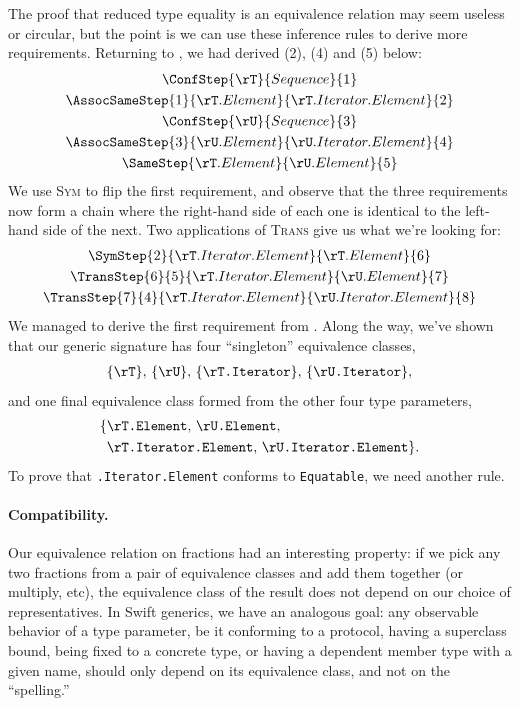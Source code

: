 \documentclass[../generics]{subfiles}
\begin{document}
\begin{example}\label{derived equiv example}
The proof that reduced type equality is an equivalence relation may seem useless or circular, but the point is we can use these inference rules to derive more requirements. Returning to , we had derived (2), (4) and (5) below:
\begin{gather*}
\ConfStep{\rT}{Sequence}{1}\\
\AssocSameStep{1}{\rT.Element}{\rT.Iterator.Element}{2}\\
\ConfStep{\rU}{Sequence}{3}\\
\AssocSameStep{3}{\rU.Element}{\rU.Iterator.Element}{4}\\
\SameStep{\rT.Element}{\rU.Element}{5}
\end{gather*}
We use \textsc{Sym} to flip the first requirement, and observe that the three requirements now form a chain where the right-hand side of each one is identical to the left-hand side of the next. Two applications of \textsc{Trans} give us what we're looking for:
\begin{gather*}
\SymStep{2}{\rT.Iterator.Element}{\rT.Element}{6}\\
\TransStep{6}{5}{\rT.Iterator.Element}{\rU.Element}{7}\\
\TransStep{7}{4}{\rT.Iterator.Element}{\rU.Iterator.Element}{8}
\end{gather*}
We managed to derive the first requirement from . Along the way, we've shown that our generic signature has four ``singleton'' equivalence classes,
\begin{gather*}
\{\texttt{\rT}\},\,
\{\texttt{\rU}\},\,
\{\texttt{\rT.Iterator}\},\,
\{\texttt{\rU.Iterator}\},
\end{gather*}
and one final equivalence class formed from the other four type parameters,
\begin{align*}
\{&\texttt{\rT.Element},\,\texttt{\rU.Element},\,\\
&\texttt{\rT.Iterator.Element},\,\texttt{\rU.Iterator.Element}\}.
\end{align*}
To prove that \texttt{\rT.Iterator.Element} conforms to \texttt{Equatable}, we need another rule.
\end{example}

\paragraph{Compatibility.}
Our equivalence relation on fractions had an interesting property: if we pick any two fractions from a pair of equivalence classes and add them together (or multiply, etc), the equivalence class of the result does not depend on our choice of representatives. In Swift generics, we have an analogous goal: any observable behavior of a type parameter, be it conforming to a protocol, having a superclass bound, being fixed to a concrete type, or having a dependent member type with a given name, should only depend on its equivalence class, and not on the ``spelling.''
\end{document}
